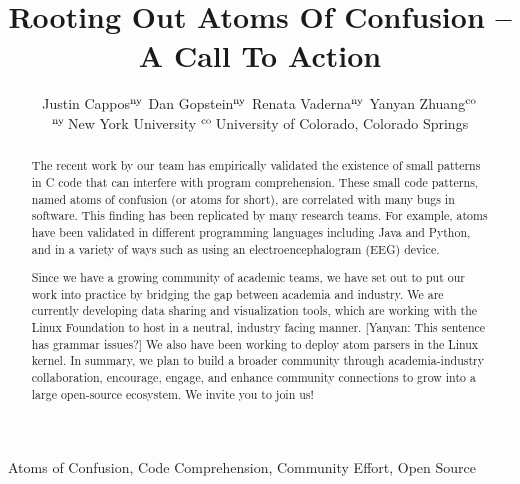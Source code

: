 \documentclass[conference]{IEEEtran}
\begin{document}
\newif\ifrev
\revtrue
\ifrev
  \newcommand{\yanyan}[1]{{\color{blue} [Yanyan: #1]}}
  \newcommand{\red}[1]{\textcolor{red}{#1}}
  \newcommand{\todo}[1]{\textcolor{red}{\textbf{Anyone todo}: #1}}
\else
  \newcommand{\yanyan}[1]{}
  \newcommand{\red}[1]{}
  \newcommand{\todo}[1]{}
\fi

\title{Rooting Out Atoms Of Confusion -- A Call To Action}

\author{Justin Cappos${}^{\rm ny}$ \qquad Dan Gopstein${}^{\rm ny}$ \qquad Renata Vaderna${}^{\rm ny}$ \qquad Yanyan Zhuang${}^{\rm co}$\\
${}^{\rm ny}$\,New York University 
${}^{\rm co}$\,University of Colorado, Colorado Springs  %
}

\maketitle

\begin{abstract}
The recent work by our team has empirically 
validated the existence of small patterns in C code
that can interfere with program comprehension.
These small code patterns, named atoms of confusion 
(or atoms for short), are correlated with many bugs in software. This finding has been replicated by many 
research teams. For example, atoms have been validated 
in different programming languages including Java and 
Python, and in a variety of ways such as using an 
electroencephalogram (EEG) device.

Since we have a growing community of academic teams, 
we have set out to put our work into practice by 
bridging the gap between academia and industry.  We 
are currently developing data 
sharing and visualization tools, which are working with the Linux Foundation 
to host in a neutral, industry facing manner. \yanyan{This sentence has grammar issues?}  We 
also have been working to deploy atom parsers in the Linux 
kernel. In summary, we plan to build a broader 
community through academia-industry collaboration,  
encourage, engage, and enhance community connections 
to grow into a large open-source ecosystem.  We invite you to join us!
\end{abstract}

\begin{IEEEkeywords}
Atoms of Confusion, Code Comprehension, Community Effort, Open Source
\end{IEEEkeywords}
\end{document}
